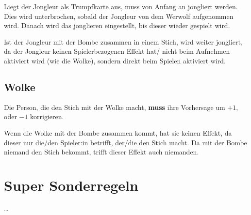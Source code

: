 \documentclass[3pt]{article}
\begin{document}
Liegt der Jongleur als Trumpfkarte aus, muss von Anfang an jongliert werden.
Dies wird unterbrochen, sobald der Jongleur von dem Werwolf aufgenommen wird.
Danach wird das jonglieren eingestellt, bis dieser wieder gespielt wird.

Ist der Jongleur mit der Bombe zusammen in einem Stich, wird weiter jongliert, da der Jongleur keinen Spielerbezogenen Effekt hat/ nicht beim Aufnehmen aktiviert wird (wie die Wolke), sondern direkt beim Spielen aktiviert wird.

\subsection{Wolke}
Die Person, die den Stich mit der Wolke macht, \textbf{muss} ihre Vorhersage um $+1$, oder $-1$ korrigieren.

Wenn die Wolke mit der Bombe zusammen kommt, hat sie keinen Effekt, da dieser nur die/den Spieler:in betrifft, der/die den Stich macht.
Da mit der Bombe niemand den Stich bekommt, trifft dieser Effekt auch niemanden.


\section{Super Sonderregeln}
\ldots
\end{document}
